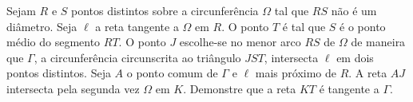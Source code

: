 Sejam $R$ e $S$ pontos distintos sobre a circunferência $\Omega$ tal que $RS$ não é um diâmetro. Seja $\ell$ a reta tangente a $\Omega$ em $R$. O ponto $T$ é tal que $S$ é o ponto médio do segmento $RT$. O ponto $J$ escolhe-se no menor arco $RS$ de $\Omega$ de maneira que $\Gamma$, a circunferência circunscrita ao triângulo $JST$, intersecta $\ell$ em dois pontos distintos. Seja $A$ o ponto comum de $\Gamma$ e $\ell$ mais próximo de $R$. A reta $AJ$ intersecta pela segunda vez $\Omega$ em $K$. Demonstre que a reta $KT$ é tangente a $\Gamma$.
